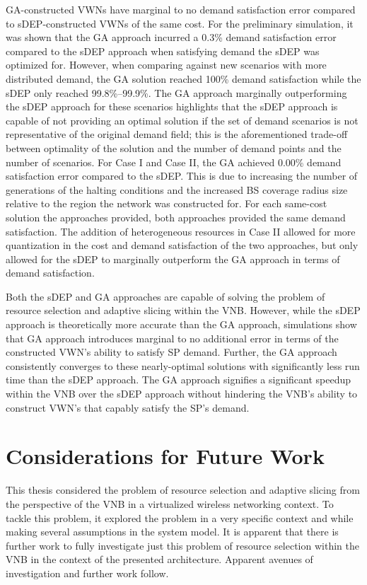 \documentclass[12pt,dvipsnames]{report}
\begin{document}
GA-constructed VWNs have marginal to no demand satisfaction error compared to sDEP-constructed VWNs of the same cost.  For the preliminary simulation, it was shown that the GA approach incurred a 0.3\% demand satisfaction error compared to the sDEP approach when satisfying demand the sDEP was optimized for.  However, when comparing against new scenarios with more distributed demand, the GA solution reached 100\% demand satisfaction while the sDEP only reached 99.8\%--99.9\%.  The GA approach marginally outperforming the sDEP approach for these scenarios highlights that the sDEP approach is capable of not providing an optimal solution if the set of demand scenarios is not representative of the original demand field; this is the aforementioned trade-off between optimality of the solution and the number of demand points and the number of scenarios.  For Case I and Case II, the GA achieved 0.00\% demand satisfaction error compared to the sDEP.  This is due to increasing the number of generations of the halting conditions and the increased BS coverage radius size relative to the region the network was constructed for.  For each same-cost solution the approaches provided, both approaches provided the same demand satisfaction.  The addition of heterogeneous resources in Case II allowed for more quantization in the cost and demand satisfaction of the two approaches, but only allowed for the sDEP to marginally outperform the GA approach in terms of demand satisfaction.

Both the sDEP and GA approaches are capable of solving the problem of resource selection and adaptive slicing within the VNB.  However, while the sDEP approach is theoretically more accurate than the GA approach, simulations show that GA approach introduces marginal to no additional error in terms of the constructed VWN's ability to satisfy SP demand.  Further, the GA approach consistently converges to these nearly-optimal solutions with significantly less run time than the sDEP approach.  The GA approach signifies a significant speedup within the VNB over the sDEP approach without hindering the VNB's ability to construct VWN's that capably satisfy the SP's demand.

\section{Considerations for Future Work} \label{sec:futurework}

This thesis considered the problem of resource selection and adaptive slicing from the perspective of the VNB in a virtualized wireless networking context.  To tackle this problem, it explored the problem in a very specific context and while making several assumptions in the system model.  It is apparent that there is further work to fully investigate just this problem of resource selection within the VNB in the context of the presented architecture.  Apparent avenues of investigation and further work follow.
\end{document}
